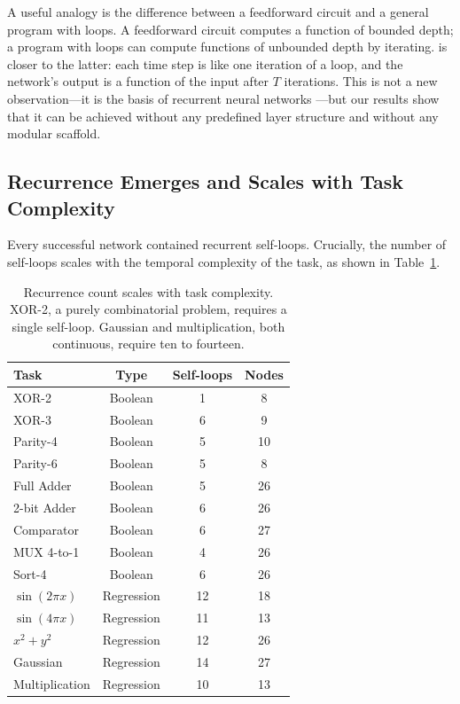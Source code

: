 A useful analogy is the difference between a feedforward circuit and a
general program with loops. A feedforward circuit computes a function
of bounded depth; a program with loops can compute functions of
unbounded depth by iterating. \modnet{} is closer to the latter: each
time step is like one iteration of a loop, and the network's output is
a function of the input after $T$ iterations. This is not a new
observation---it is the basis of recurrent neural networks
\citep{siegelmann1995computational}---but our results show that it can
be achieved without any predefined layer structure and without any
modular scaffold.

\subsection{Recurrence Emerges and Scales with Task Complexity}
\label{sec:disc-recurrence}

Every successful network contained recurrent self-loops. Crucially, the
number of self-loops scales with the temporal complexity of the task,
as shown in Table~\ref{tab:recurrence-disc}.

\begin{table}[h]
  \centering
  \small
  \caption{Recurrence count scales with task complexity. XOR-2, a purely
    combinatorial problem, requires a single self-loop. Gaussian and
    multiplication, both continuous, require ten to fourteen.}
  \label{tab:recurrence-disc}
  \begin{tabular}{lccc}
    \toprule
    \textbf{Task} & \textbf{Type} & \textbf{Self-loops} & \textbf{Nodes} \\
    \midrule
    XOR-2            & Boolean    &  1 &  8 \\
    XOR-3            & Boolean    &  6 &  9 \\
    Parity-4         & Boolean    &  5 & 10 \\
    Parity-6         & Boolean    &  5 &  8 \\
    Full Adder       & Boolean    &  5 & 26 \\
    2-bit Adder      & Boolean    &  6 & 26 \\
    Comparator       & Boolean    &  6 & 27 \\
    MUX 4-to-1       & Boolean    &  4 & 26 \\
    Sort-4           & Boolean    &  6 & 26 \\
    \midrule
    $\sin(2\pi x)$   & Regression & 12 & 18 \\
    $\sin(4\pi x)$   & Regression & 11 & 13 \\
    $x^2 + y^2$      & Regression & 12 & 26 \\
    Gaussian         & Regression & 14 & 27 \\
    Multiplication   & Regression & 10 & 13 \\
    \bottomrule
  \end{tabular}
\end{table}

